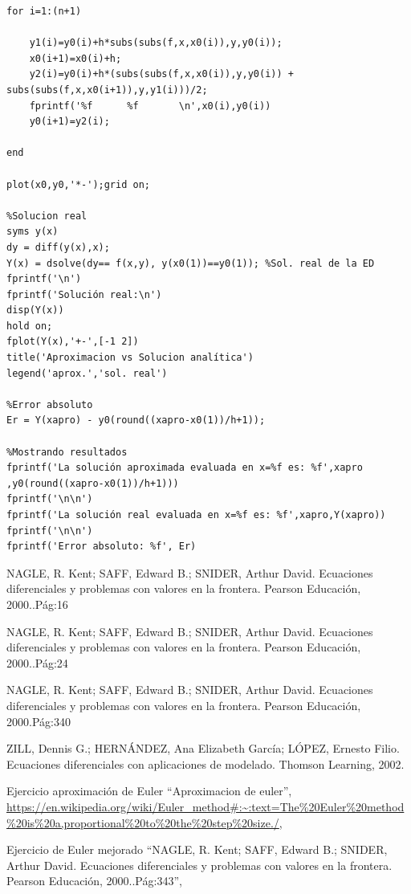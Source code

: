 \documentclass[12 pt,letterpaper]{article}
\newcommand{\bibTitle}[1]{``#1''}
\begin{document}
\begin{itemize}
\begin{lstlisting}
for i=1:(n+1)
    
    y1(i)=y0(i)+h*subs(subs(f,x,x0(i)),y,y0(i));
    x0(i+1)=x0(i)+h;
    y2(i)=y0(i)+h*(subs(subs(f,x,x0(i)),y,y0(i)) + subs(subs(f,x,x0(i+1)),y,y1(i)))/2;
    fprintf('%f      %f       \n',x0(i),y0(i))
    y0(i+1)=y2(i);
    
end

plot(x0,y0,'*-');grid on;

%Solucion real
syms y(x)
dy = diff(y(x),x);
Y(x) = dsolve(dy== f(x,y), y(x0(1))==y0(1)); %Sol. real de la ED
fprintf('\n')
fprintf('Solución real:\n')
disp(Y(x))
hold on;
fplot(Y(x),'+-',[-1 2])
title('Aproximacion vs Solucion analítica')
legend('aprox.','sol. real')

%Error absoluto
Er = Y(xapro) - y0(round((xapro-x0(1))/h+1));

%Mostrando resultados
fprintf('La solución aproximada evaluada en x=%f es: %f',xapro ,y0(round((xapro-x0(1))/h+1)))
fprintf('\n\n')
fprintf('La solución real evaluada en x=%f es: %f',xapro,Y(xapro))
fprintf('\n\n')
fprintf('Error absoluto: %f', Er)
	\end{lstlisting}
	\newpage
\begin{thebibliography}{99}
\small

 {NAGLE, R. Kent; SAFF, Edward B.; SNIDER, Arthur David. Ecuaciones diferenciales y problemas con valores en la frontera. Pearson Educación, 2000..Pág:16} 

 {NAGLE, R. Kent; SAFF, Edward B.; SNIDER, Arthur David. Ecuaciones diferenciales y problemas con valores en la frontera. Pearson Educación, 2000..Pág:24} 

 {NAGLE, R. Kent; SAFF, Edward B.; SNIDER, Arthur David. Ecuaciones diferenciales y problemas con valores en la frontera. Pearson Educación, 2000.Pág:340} 

 {ZILL, Dennis G.; HERNÁNDEZ, Ana Elizabeth García; LÓPEZ, Ernesto Filio. Ecuaciones diferenciales con aplicaciones de modelado. Thomson Learning, 2002.} 

 {Ejercicio aproximación de Euler} 
\bibTitle{Aproximacion de euler}, 
\url{https://en.wikipedia.org/wiki/Euler_method#:~:text=The%20Euler%20method%20is%20a,proportional%20to%20the%20step%20size./},

 {Ejercicio de Euler mejorado} 
\bibTitle{NAGLE, R. Kent; SAFF, Edward B.; SNIDER, Arthur David. Ecuaciones diferenciales y problemas con valores en la frontera. Pearson Educación, 2000..Pág:343},










\end{thebibliography}

	\end{itemize}
\end{document}
